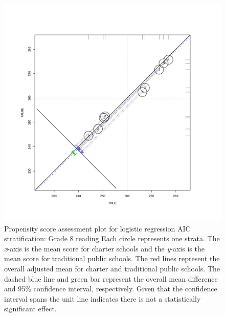 \begin{figure}
\begin{center}
\includegraphics[trim=0 .7in 0 .7in]{../Figures2009/g8read-circpsa10-AIC.pdf}
\caption[Propensity score assessment plot for logistic regression AIC stratification: Grade 8 reading]{Propensity score assessment plot for logistic regression AIC stratification: Grade 8 reading Each circle represents one strata. The \textit{x}-axis is the mean score for charter schools and the \textit{y}-axis is the mean score for traditional public schools. The red lines represent the overall adjusted mean for charter and traditional public schools. The dashed blue line and green bar represent the overall mean difference and 95\% confidence interval, respectively. Given that the confidence interval spans the unit line indicates there is not a statistically significant effect.}
\end{center}
\end{figure}

\clearpage




